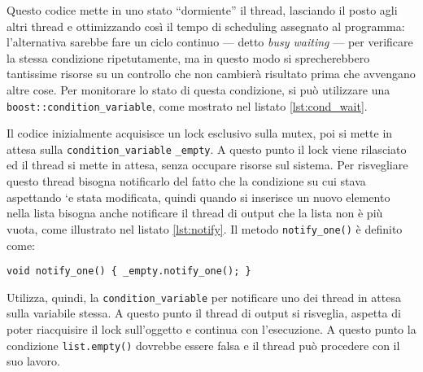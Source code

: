 Questo codice mette in uno stato ``dormiente'' il thread, lasciando il posto
agli altri thread e ottimizzando cos\`i il tempo di scheduling assegnato al
programma: l'alternativa sarebbe fare un ciclo continuo --- detto \emph{busy waiting} --- per verificare la stessa
condizione ripetutamente, ma in questo modo si sprecherebbero tantissime risorse
su un controllo che non cambier\`a risultato prima che avvengano altre cose. Per
monitorare lo stato di questa condizione, si pu\`o utilizzare una
\texttt{boost::condition\_variable}, come mostrato nel listato \ref{lst:cond_wait}.

Il codice inizialmente acquisisce un lock esclusivo sulla mutex, poi si mette in
attesa sulla \texttt{condition\_variable} \texttt{\_empty}. A questo punto
il lock viene rilasciato ed il thread si mette in attesa, senza occupare risorse
sul sistema. Per risvegliare questo thread bisogna notificarlo del fatto che la
condizione su cui stava aspettando `e stata modificata, quindi quando si
inserisce un nuovo elemento nella lista bisogna anche notificare il thread di
output che la lista non \`e pi\`u vuota, come illustrato nel listato
\ref{lst:notify}. Il metodo \texttt{notify\_one()} \`e definito come:
\begin{lstlisting}[frame=none]
    void notify_one() { _empty.notify_one(); }
\end{lstlisting}
Utilizza, quindi, la \texttt{condition\_variable} per notificare uno dei thread
in attesa sulla variabile stessa. A questo punto il thread di output si
risveglia, aspetta di poter riacquisire il lock sull'oggetto e continua con
l'esecuzione. A questo punto la condizione \texttt{list.empty()} dovrebbe
essere falsa e il thread pu\`o procedere con il suo lavoro.


